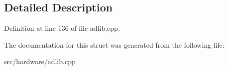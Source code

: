 \subsection{Detailed Description}


Definition at line 136 of file adlib.\-cpp.



The documentation for this struct was generated from the following file\-:\begin{DoxyCompactItemize}
\item 
src/hardware/adlib.\-cpp\end{DoxyCompactItemize}

